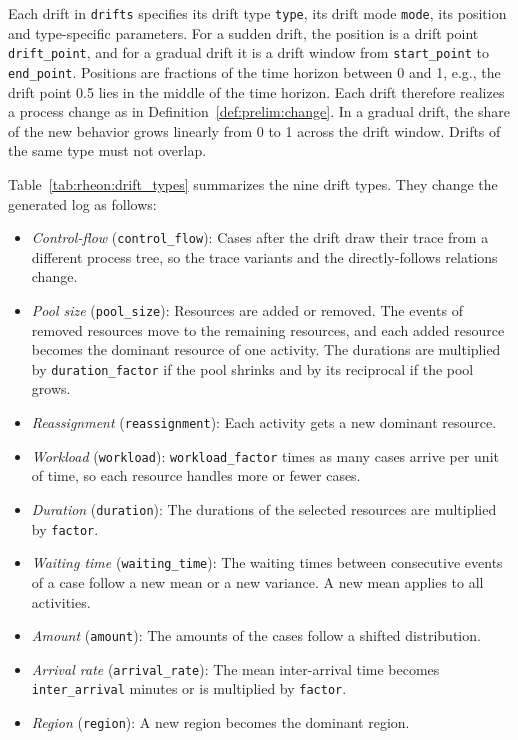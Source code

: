 Each drift in \texttt{drifts} specifies its drift type \texttt{type}, its drift mode \texttt{mode}, its position and type-specific parameters. For a sudden drift, the position is a drift point \texttt{drift\_point}, and for a gradual drift it is a drift window from \texttt{start\_point} to \texttt{end\_point}. Positions are fractions of the time horizon between 0 and 1, e.g., the drift point 0.5 lies in the middle of the time horizon. Each drift therefore realizes a process change as in Definition~\ref{def:prelim:change}. In a gradual drift, the share of the new behavior grows linearly from 0 to 1 across the drift window. Drifts of the same type must not overlap.

Table~\ref{tab:rheon:drift_types} summarizes the nine drift types. They change the generated log as follows:
\begin{itemize}
	\item \emph{Control-flow} (\texttt{control\_flow}): Cases after the drift draw their trace from a different process tree, so the trace variants and the directly-follows relations change.
	\item \emph{Pool size} (\texttt{pool\_size}): Resources are added or removed. The events of removed resources move to the remaining resources, and each added resource becomes the dominant resource of one activity. The durations are multiplied by \texttt{duration\_factor} if the pool shrinks and by its reciprocal if the pool grows.
	\item \emph{Reassignment} (\texttt{reassignment}): Each activity gets a new dominant resource.
	\item \emph{Workload} (\texttt{workload}): \texttt{workload\_factor} times as many cases arrive per unit of time, so each resource handles more or fewer cases.
	\item \emph{Duration} (\texttt{duration}): The durations of the selected resources are multiplied by \texttt{factor}.
	\item \emph{Waiting time} (\texttt{waiting\_time}): The waiting times between consecutive events of a case follow a new mean or a new variance. A new mean applies to all activities.
	\item \emph{Amount} (\texttt{amount}): The amounts of the cases follow a shifted distribution.
	\item \emph{Arrival rate} (\texttt{arrival\_rate}): The mean inter-arrival time becomes \texttt{inter\_arrival} minutes or is multiplied by \texttt{factor}.
	\item \emph{Region} (\texttt{region}): A new region becomes the dominant region.
\end{itemize}

